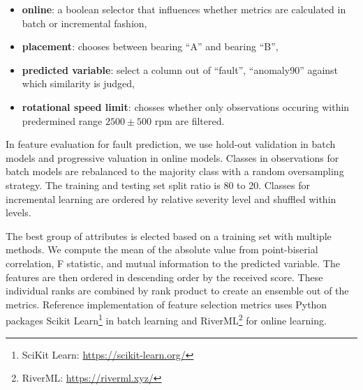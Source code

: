 \begin{itemize}
\itemsep0pt
\item \textbf{online}: a boolean selector that influences whether metrics are calculated in batch or incremental fashion,
\item \textbf{placement}: chooses between bearing ``A'' and bearing ``B'',
\item \textbf{predicted variable}: select a column out of ``fault'', ``anomaly90'' against which similarity is judged,
\item \textbf{rotational speed limit}: chosses whether only observations occuring within predermined range $2500 \pm 500$ rpm are filtered.
\end{itemize}

In feature evaluation for fault prediction, we use hold-out validation in batch models and progressive valuation in online models. Classes in observations for batch models are rebalanced to the majority class with a random oversampling strategy. The training and testing set split ratio is 80 to 20. Classes for incremental learning are ordered by relative severity level and shuffled within levels. 

The best group of attributes is elected based on a training set with multiple methods. We compute the mean of the absolute value from point-biserial correlation, F statistic, and mutual information to the predicted variable. The features are then ordered in descending order by the received score. These individual ranks are combined by rank product to create an ensemble out of the metrics. Reference implementation of feature selection metrics uses Python packages Scikit Learn\footnote{SciKit Learn: \url{https://scikit-learn.org/}} in batch learning and RiverML\footnote{RiverML: \url{https://riverml.xyz/}} for online learning.

